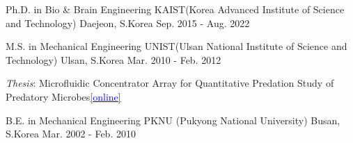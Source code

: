 

\begin{cventries}

  \cventry
    {Ph.D. in Bio \& Brain Engineering} %
    {KAIST(Korea Advanced Institute of Science and Technology)} %
    {Daejeon, S.Korea} %
    {Sep. 2015 - Aug. 2022} %
    {}
    
  \cventry
    {M.S. in Mechanical Engineering} %
    {UNIST(Ulsan National Institute of Science and Technology)} %
    {Ulsan, S.Korea} %
    {Mar. 2010 - Feb. 2012} %
    {
      \begin{cvitems} %
      \item {\textit{Thesis}: Microfluidic Concentrator Array for Quantitative Predation Study of Predatory Microbes\href{https://scholarworks.unist.ac.kr/handle/201301/1123}{[\textcolor{blue}{online}]}}
      \end{cvitems}
    }

  \cventry
    {B.E. in Mechanical Engineering} %
    {PKNU (Pukyong National University)} %
    {Busan, S.Korea} %
    {Mar. 2002 - Feb. 2010} %
    {}
    
\end{cventries}
